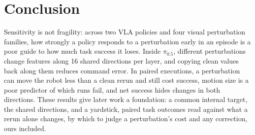 \section{Conclusion}

Sensitivity is not fragility: across two VLA policies and four visual perturbation families, how strongly a policy responds to a perturbation early in an episode is a poor guide to how much task success it loses. Inside $\pi_{0.5}$, different perturbations change features along 16 shared directions per layer, and copying clean values back along them reduces command error. In paired executions, a perturbation can move the robot less than a clean rerun and still cost success, motion size is a poor predictor of which runs fail, and net success hides changes in both directions. These results give later work a foundation: a common internal target, the shared directions, and a yardstick, paired task outcomes read against what a rerun alone changes, by which to judge a perturbation's cost and any correction, ours included.
